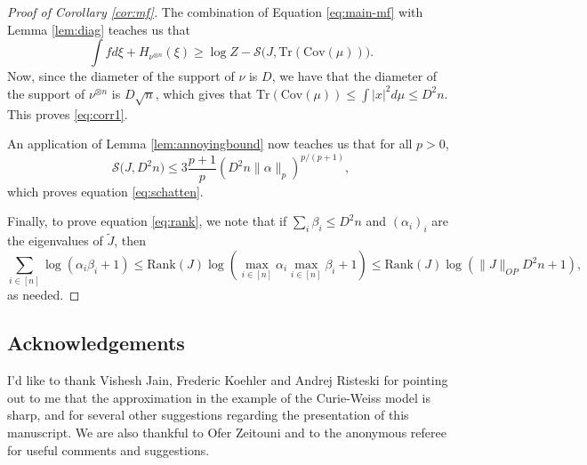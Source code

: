 \documentclass[12pt]{article}
\def \Tr {\mathrm{Tr}}
\def \Cov {\mathrm {Cov}}
\def \Cov {\mathrm{Cov}}
\theoremstyle{definition}
\theoremstyle{remark}
\begin{document}
\begin{proof}[Proof of Corollary \ref{cor:mf}]
The combination of Equation \eqref{eq:main-mf} with Lemma \ref{lem:diag} teaches us that
$$
\int f d \xi + H_{\nu^{\otimes n}} (\xi) \geq \log Z - \mathcal{S}\bigl (J, \Tr(\Cov(\mu)) \bigr ).
$$
Now, since the diameter of the support of $\nu$ is $D$, we have that the diameter of the support of $\nu^{\otimes n}$ is $D \sqrt{n}$, which gives that $\Tr(\Cov(\mu)) \leq \int |x|^2 d \mu \leq D^2 n$. This proves \eqref{eq:corr1}.

An application of Lemma \ref{lem:annoyingbound} now teaches us that for all $p>0$,
$$
\mathcal{S}\bigl (J, D^2 n \bigr ) \leq 3 \frac{p+1}{p} \left (D^2 n \| \alpha \|_p \right )^{p/(p+1)},
$$
which proves equation \eqref{eq:schatten}.

Finally, to prove equation \eqref{eq:rank}, we note that if $\sum_i \beta_i \leq D^2 n$ and $(\alpha_i)_i$ are the eigenvalues of $\tilde J$, then
$$
\sum_{i \in [n]} \log(\alpha_i \beta_i + 1) \leq \mathrm{Rank}(J) \log \left (\max_{i \in [n]} \alpha_i \max_{i \in [n]} \beta_i + 1 \right ) \leq \mathrm{Rank}(J) \log \left (\|J\|_{OP} D^2 n + 1 \right ),
$$
as needed.
\end{proof}

\subsection*{Acknowledgements}
I'd like to thank Vishesh Jain, Frederic Koehler and Andrej Risteski for pointing out to me that the approximation in the example of the Curie-Weiss model is sharp, and for several other suggestions regarding the presentation of this manuscript. We are also thankful to Ofer Zeitouni and to the anonymous referee for useful comments and suggestions.



\end{document}
